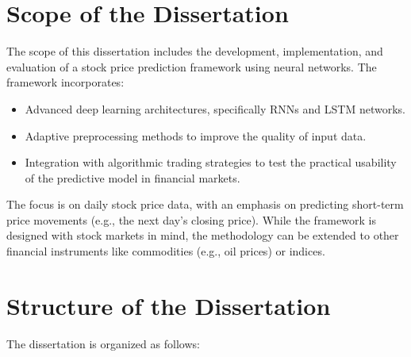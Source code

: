 \section{Scope of the Dissertation}
The scope of this dissertation includes the development, implementation, and evaluation of a stock price prediction framework using neural networks. The framework incorporates:
\begin{itemize}
    \item Advanced deep learning architectures, specifically RNNs and LSTM networks.
    \item Adaptive preprocessing methods to improve the quality of input data.
    \item Integration with algorithmic trading strategies to test the practical usability of the predictive model in financial markets.
\end{itemize}

The focus is on daily stock price data, with an emphasis on predicting short-term price movements (e.g., the next day’s closing price). While the framework is designed with stock markets in mind, the methodology can be extended to other financial instruments like commodities (e.g., oil prices) or indices.

\section{Structure of the Dissertation}

The dissertation is organized as follows:

